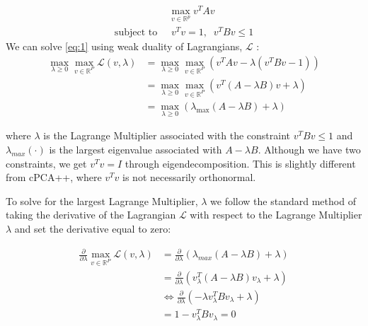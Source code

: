 \documentclass[12pt]{article}
\begin{document}
\begin{align}
  &\max_{v\in \mathbb{R}^p}{v^TAv} \label{eq:1} \\ \text{subject to }&\; v^{T}v=1,\;\; v^TBv \leq 1 \nonumber
\end{align}
We can solve \ref{eq:1} using weak duality of Lagrangians, $\mathcal{L}$ :
\begin{align}
  \max_{\lambda \geq 0}{\max_{v\in \mathbb{R}^{P}}{\mathcal{L}}}\left(v,\lambda\right) &= \max_{\lambda \geq 0}{\max_{v\in \mathbb{R}^{P}}{\left( v^TAv - \lambda\left(v^TBv - 1\right)\right)}} \nonumber\\
                                                                                       &= \max_{\lambda \geq 0}{\max_{v\in \mathbb{R}^{P}}{\left(v^T\left(A - \lambda B\right)v + \lambda\right)}}\nonumber\\
                                                                                       &= \max_{\lambda \geq 0}{\left(\lambda_{\text{max}}\left(A - \lambda B\right) + \lambda\right)} \label{eq:2}
\end{align}

where $\lambda$ is the Lagrange Multiplier associated with the constraint $v^TBv \leq 1$ and $\lambda_{max}\left(\cdot\right)$ is the largest eigenvalue associated with $A - \lambda B$. Although we have two constraints, we get $v^T v = I$ through eigendecomposition. This is slightly different from cPCA++, where $v^{T}v$ is not necessarily orthonormal. 

To solve for the largest Lagrange Multiplier, $\lambda$ we follow the standard method of taking the derivative of the Lagrangian $\mathcal{L}$ with respect to the Lagrange Multiplier $\lambda$ and set the derivative equal to zero: 

\begin{align}
  \frac{\partial}{\partial\lambda} \max_{v\in \mathbb{R}^{P}}\mathcal{L}\left(v,\lambda\right) &= \frac{\partial}{\partial\lambda}\left(\lambda_{max}\left(A-\lambda B\right)  + \lambda\right) \nonumber \\ 
                                                                                               &= \frac{\partial}{\partial\lambda}\left(v_{\lambda}^{T}\left(A- \lambda B\right)v_{\lambda} +\lambda \right) \nonumber\\
                                                                                               &\Leftrightarrow \frac{\partial}{\partial\lambda}\left( -\lambda v_{\lambda}^{T} Bv_{\lambda} +\lambda \right) \nonumber\\
                                                                                               &= 1-v_{\lambda}^{T}B v_{\lambda} = 0 \label{eq:3}
\end{align}
\end{document}
